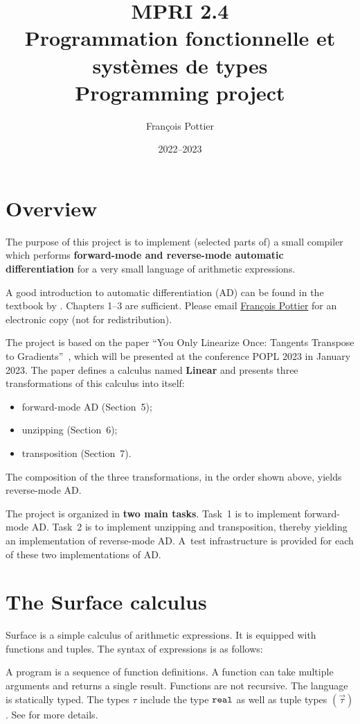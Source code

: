 \documentclass{article}
\title{MPRI 2.4 \\
       Programmation fonctionnelle et systèmes de types \\
       Programming project}
\author{François Pottier}
\date{2022--2023}
\begin{document}
\maketitle


\section{Overview}

The purpose of this project is to implement (selected parts of) a small
compiler which performs \textbf{forward-mode and reverse-mode automatic
  differentiation} for a very small language of arithmetic expressions.

A good introduction to automatic differentiation (AD) can be found in the
textbook by \citet{griewank-walther}. Chapters 1--3 are sufficient. Please
email \href{mailto:francois.pottier@inria.fr}{François Pottier} for an
electronic copy (not for redistribution).

The project is based on the paper ``You Only Linearize Once: Tangents
Transpose to Gradients''~\citep{radul-al-23}, which will be presented
at the conference POPL 2023 in January 2023.
%
The paper defines a calculus named \textbf{Linear} and presents three
transformations of this calculus into itself:
\begin{itemize}
\item forward-mode AD (Section~5);
\item unzipping (Section~6);
\item transposition (Section~7).
\end{itemize}
The composition of the three transformations, in the order shown above,
yields reverse-mode AD.

The project is organized in \textbf{two main tasks}. Task~1 is to implement
forward-mode AD. Task~2 is to implement unzipping and transposition, thereby
yielding an implementation of reverse-mode AD. A~test infrastructure is
provided for each of these two implementations of AD.


\section{The Surface calculus}

Surface is a simple calculus of arithmetic expressions. It is equipped with
functions and tuples. The syntax of expressions is as follows:
%

%
A program is a sequence of function definitions. A function can take multiple
arguments and returns a single result. Functions are not recursive. The
language is statically typed. The types $\tau$ include the type $\text{\texttt{real}}$ as well as
tuple types $(\vec\tau)$. See  for more details.
\end{document}
